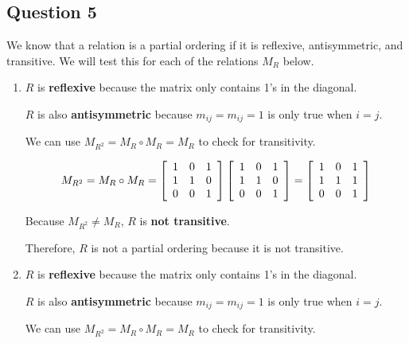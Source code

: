 \documentclass[letterpaper, 12pt]{article}
\begin{document}
\subsection*{Question 5}
We know that a relation is a partial ordering if it is reflexive, antisymmetric, and transitive. We will test this for each of the relations $M_R$ below.

\begin{enumerate}
    \item $R$ is \textbf{reflexive} because the matrix only contains 1's in the diagonal. 
    
    $R$ is also \textbf{antisymmetric} because $m_{ij} = m_{ij} = 1$ is only true when $i = j$.
    
    We can use $M_{R^2} = M_R \circ M_R = M_R$ to check for transitivity.
    
    \[
    M_{R^2} = M_R \circ M_R =
    \left[
    \begin{array}{c c c}
         1 & 0 & 1 \\
         1 & 1 & 0 \\
         0 & 0 & 1
    \end{array}
    \right]
    \left[
    \begin{array}{c c c}
         1 & 0 & 1 \\
         1 & 1 & 0 \\
         0 & 0 & 1
    \end{array}
    \right]
    =
    \left[
    \begin{array}{c c c}
         1 & 0 & 1 \\
         1 & 1 & 1 \\
         0 & 0 & 1
    \end{array}
    \right]
    \]
    
    Because $M_{R^2} \neq M_R$, $R$ is \textbf{not transitive}.
    
    Therefore, $R$ is not a partial ordering because it is not transitive.
    
    \item $R$ is \textbf{reflexive} because the matrix only contains 1's in the diagonal. 
    
    $R$ is also \textbf{antisymmetric} because $m_{ij} = m_{ij} = 1$ is only true when $i = j$.
    
    We can use $M_{R^2} = M_R \circ M_R = M_R$ to check for transitivity.
    

\end{enumerate}
\end{document}
